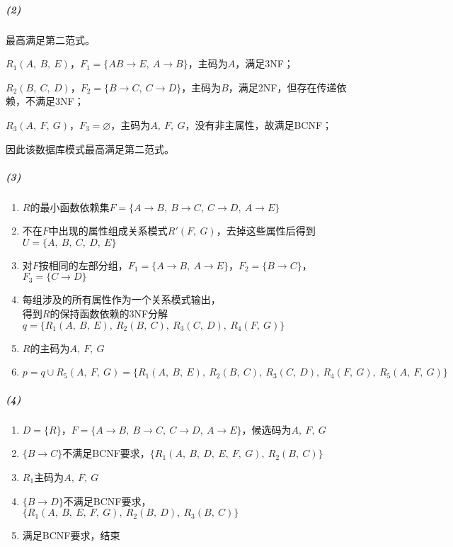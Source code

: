\documentclass{article}
\begin{document}
\subparagraph{(2)}
最高满足第二范式。\par
$R_1(A,\ B,\ E)$，$F_1 = \{AB \rightarrow E,\ A \rightarrow B\}$，主码为$A$，满足3NF；\par
$R_2(B,\ C,\ D)$，$F_2 = \{B \rightarrow C,\ C \rightarrow D\}$，主码为$B$，满足2NF，但存在传递依赖，不满足3NF；\par
$R_3(A,\ F,\ G)$，$F_3 = \varnothing$，主码为$A,\ F,\  G$，没有非主属性，故满足BCNF；\par
因此该数据库模式最高满足第二范式。

\subparagraph{(3)}
\begin{enumerate}[label = \emph{\alph*}.]
    \item $R$的最小函数依赖集$F = \{A \rightarrow B,\ B \rightarrow C,\ C \rightarrow D,\ A \rightarrow E\}$
    \item 不在$F$中出现的属性组成关系模式$R'(F,\ G)$，去掉这些属性后得到$U = \{A,\ B,\ C,\ D,\ E\}$
    \item 对$F$按相同的左部分组，$F_1 = \{A \rightarrow B,\ A \rightarrow E\}$，$F_2 = \{B \rightarrow C\}$，$F_3 = \{C \rightarrow D\}$
    \item 每组涉及的所有属性作为一个关系模式输出，\\ 得到$R$的保持函数依赖的3NF分解$q = \{R_1(A,\ B,\ E),\ R_2(B,\ C),\ R_3(C,\ D),\ R_4(F,\ G)\}$
    \item $R$的主码为$A,\ F,\  G$
    \item $p = q \cup R_5(A,\ F,\ G) = \{R_1(A,\ B,\ E),\ R_2(B,\ C),\ R_3(C,\ D),\ R_4(F,\ G),\ R_5(A,\ F,\ G)\}$
\end{enumerate}

\subparagraph{(4)}
\begin{enumerate}[label = \emph{\alph*}.]
    \item $D = \{R\}$，$F = \{A \rightarrow B,\ B \rightarrow C,\ C \rightarrow D,\ A \rightarrow E\}$，候选码为$A,\ F,\  G$
    \item $\{B \rightarrow C\}$不满足BCNF要求，$\{R_1(A,\ B,\ D,\ E,\ F,\ G),\ R_2(B,\ C)\}$
    \item $R_1$主码为$A,\ F,\  G$
    \item $\{B \rightarrow D\}$不满足BCNF要求，$\{R_1(A,\ B,\ E,\ F,\ G),\ R_2(B,\ D),\ R_3(B,\ C)\}$
    \item 满足BCNF要求，结束
\end{enumerate}
\end{document}
